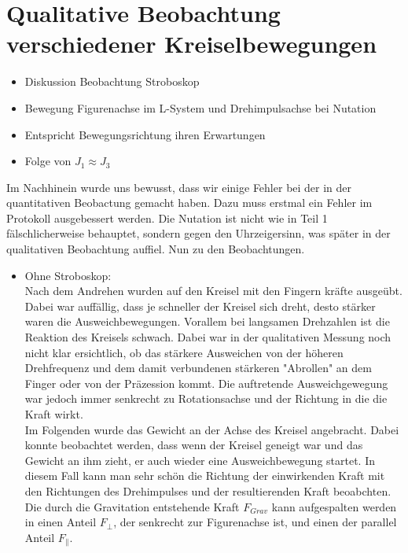

\section{Qualitative Beobachtung verschiedener Kreiselbewegungen}

\begin{itemize}
    \item Diskussion Beobachtung Stroboskop
    \item Bewegung Figurenachse im L-System und Drehimpulsachse bei Nutation
    \item Entspricht Bewegungsrichtung ihren Erwartungen
    \item Folge von $J_1 \approx J_3$
\end{itemize}

Im Nachhinein wurde uns bewusst, dass wir einige Fehler bei der in der quantitativen Beobactung gemacht haben. 
Dazu muss erstmal ein Fehler im Protokoll ausgebessert werden. Die Nutation ist nicht wie in Teil 1 fälschlicherweise 
behauptet, sondern gegen den Uhrzeigersinn, was später in der qualitativen Beobachtung auffiel. Nun zu den Beobachtungen.
\begin{itemize}
    \item Ohne Stroboskop:\\
    Nach dem Andrehen wurden auf den Kreisel mit den Fingern kräfte ausgeübt. Dabei war auffällig, dass je schneller der Kreisel sich dreht, desto stärker waren die Ausweichbewegungen.
    Vorallem bei langsamen Drehzahlen ist die Reaktion des Kreisels schwach. Dabei war in der qualitativen Messung noch nicht klar ersichtlich, ob das stärkere Ausweichen 
    von der höheren Drehfrequenz und dem damit verbundenen stärkeren "Abrollen" an dem Finger oder von der Präzession kommt. Die auftretende Ausweichgewegung war jedoch immer 
    senkrecht zu Rotationsachse und der Richtung in die die Kraft wirkt. \\
    Im Folgenden wurde das Gewicht an der Achse des Kreisel angebracht. Dabei konnte beobachtet werden, dass wenn der Kreisel geneigt war und das Gewicht an ihm zieht, er auch wieder 
    eine Ausweichbewegung startet. In diesem Fall kann man sehr schön die Richtung der einwirkenden Kraft mit den Richtungen des Drehimpulses und der resultierenden Kraft beoabchten.
    Die durch die Gravitation entstehende Kraft $F_{Grav}$ kann aufgespalten werden in einen Anteil $F_{\bot}$, der senkrecht zur Figurenachse ist, und einen der parallel Anteil $F_{\| }$. 
    
\end{itemize}
